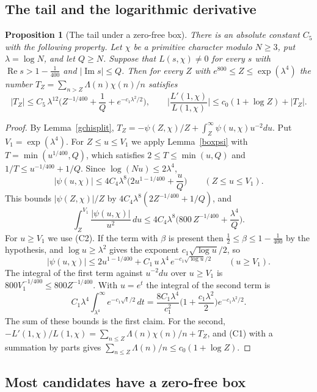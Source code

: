 \documentclass[11pt,letterpaper]{article}
\newtheorem{proposition}[theorem]{Proposition}
\numberwithin{equation}{section}
\begin{document}
\subsection{The tail and the logarithmic derivative}

\begin{proposition}[The tail under a zero-free box]\label{tailprop}
There is an absolute constant $C_5$ with the following property. Let $\chi$ be a primitive character modulo $N\ge3$, put $\lambda=\log N$, and let $Q\ge N$. Suppose that $L(s,\chi)\ne0$ for every $s$ with $\operatorname{Re}s>1-\tfrac1{400}$ and $|\operatorname{Im}s|\le Q$. Then for every $Z$ with $e^{800}\le Z\le\exp(\lambda^4)$ the number $T_Z=\sum_{n>Z}\Lambda(n)\chi(n)/n$ satisfies
\[
|T_Z|\le C_5\,\lambda^{12}\Big(Z^{-1/400}+\frac1Q+e^{-c_1\lambda^2/2}\Big),\qquad\Big|\frac{L'(1,\chi)}{L(1,\chi)}\Big|\le c_0(1+\log Z)+|T_Z| .
\]
\end{proposition}
\begin{proof}
By Lemma~\ref{gchisplit}, $T_Z=-\psi(Z,\chi)/Z+\int_Z^\infty\psi(u,\chi)u^{-2}du$. Put $V_1=\exp(\lambda^4)$. For $Z\le u\le V_1$ we apply Lemma~\ref{boxpsi} with $T=\min(u^{1/400},Q)$, which satisfies $2\le T\le\min(u,Q)$ and $1/T\le u^{-1/400}+1/Q$. Since $\log(Nu)\le2\lambda^4$,
\[
|\psi(u,\chi)|\le4C_4\lambda^8\Big(2u^{1-1/400}+\frac uQ\Big)\qquad(Z\le u\le V_1).
\]
This bounds $|\psi(Z,\chi)|/Z$ by $4C_4\lambda^8(2Z^{-1/400}+1/Q)$, and
\[
\int_Z^{V_1}\frac{|\psi(u,\chi)|}{u^2}\,du\le4C_4\lambda^8\Big(800\,Z^{-1/400}+\frac{\lambda^4}Q\Big).
\]
For $u\ge V_1$ we use (C2). If the term with $\beta$ is present then $\tfrac12\le\beta\le1-\tfrac1{400}$ by the hypothesis, and $\log u\ge\lambda^2$ gives the exponent $c_1\sqrt{\log u}/2$, so
\[
|\psi(u,\chi)|\le2u^{1-1/400}+C_1\,u\,\lambda^4\,e^{-c_1\sqrt{\log u}/2}\qquad(u\ge V_1).
\]
The integral of the first term against $u^{-2}du$ over $u\ge V_1$ is $800V_1^{-1/400}\le800Z^{-1/400}$. With $u=e^t$ the integral of the second term is
\[
C_1\lambda^4\int_{\lambda^4}^\infty e^{-c_1\sqrt t/2}\,dt=\frac{8C_1\lambda^4}{c_1^2}\Big(1+\frac{c_1\lambda^2}2\Big)e^{-c_1\lambda^2/2}.
\]
The sum of these bounds is the first claim. For the second, $-L'(1,\chi)/L(1,\chi)=\sum_{n\le Z}\Lambda(n)\chi(n)/n+T_Z$, and (C1) with a summation by parts gives $\sum_{n\le Z}\Lambda(n)/n\le c_0(1+\log Z)$.
\end{proof}

\subsection{Most candidates have a zero-free box}
\end{document}
